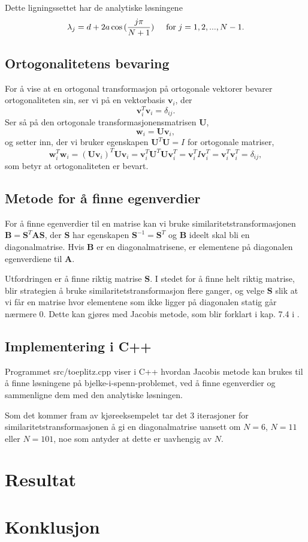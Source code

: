\documentclass[a4paper,10pt,english]{article}
\begin{document}
Dette ligningssettet har de analytiske løsningene
$$\lambda_j = d+2a\cos{(\frac{j\pi}{N+1})} \hspace{0.5cm} \mathrm{for} \hspace{0.1cm} j=1,2,...,N-1.$$

\subsection*{Ortogonalitetens bevaring}
For å vise at en ortogonal transformasjon på ortogonale vektorer bevarer
ortogonaliteten sin, ser vi på en vektorbasis $\mathbf{v}_i$, der
$$\mathbf{v}_i^T \mathbf{v}_i = \delta_{i j} .$$
Ser så på den ortogonale transformasjonensmatrisen $\mathbf{U}$,
$$\mathbf{w}_i = \mathbf{U} \mathbf{v}_i ,$$
og setter inn, der vi bruker egenskapen $\mathbf{U}^T \mathbf{U} = I$ for ortogonale
matriser,
$$\mathbf{w}_i^T \mathbf{w}_i = (\mathbf{U} \mathbf{v}_i)^T \mathbf{U} \mathbf{v}_i = \mathbf{v}_i^T \mathbf{U}^T \mathbf{U} \mathbf{v}_i^T = \mathbf{v}_i^T I \mathbf{v}_i^T = \mathbf{v}_i^T \mathbf{v}_i^T = \delta_{i j},$$
som betyr at ortogonaliteten er bevart.

\subsection*{Metode for å finne egenverdier}
For å finne egenverdier til en matrise kan vi bruke similaritetstransformasjonen $\mathbf{B}=\mathbf{S}^T\mathbf{A}\mathbf{S}$, der $\mathbf{S}$ har egenskapen $\mathbf{S}^{-1}=\mathbf{S}^T$ og $\mathbf{B}$ ideelt skal bli en diagonalmatrise. Hvis $\mathbf{B}$ er en diagonalmatrisene, er elementene på diagonalen egenverdiene til $\mathbf{A}$.

Utfordringen er å finne riktig matrise $\mathbf{S}$. I stedet for å finne helt riktig matrise, blir strategien å bruke similaritetstransformasjon flere ganger, og velge $\mathbf{S}$ slik at vi får en matrise hvor elementene som ikke ligger på diagonalen statig går nærmere 0. Dette kan gjøres med Jacobis metode, som blir forklart i kap. 7.4 i \cite{komp}.

\subsection*{Implementering i C++}
Programmet src/toeplitz.cpp viser i C++ hvordan Jacobis metode kan brukes til å finne løsningene på bjelke-i-spenn-problemet, ved å finne egenverdier og sammenligne dem med den analytiske løsningen.

Som det kommer fram av kjøreeksempelet tar det 3 iterasjoner for similaritetstransformasjonen å gi en diagonalmatrise uansett om $N=6$, $N=11$ eller $N=101$, noe som antyder at dette er uavhengig av $N$.

\section*{Resultat}

\section*{Konklusjon}

\printbibliography
\end{document}
